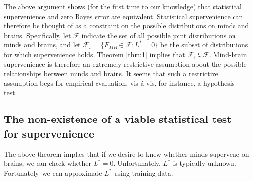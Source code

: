 \documentclass{article}
\providecommand{\mc}[1]{\mathcal{#1}}
\begin{document}

The above argument shows (for the first time to our knowledge) that statistical supervenience and zero Bayes error are equivalent. Statistical supervenience can therefore be thought of as a constraint on the possible distributions on minds and brains.  Specifically, let $\mc{F}$ indicate the set of all possible joint distributions on minds and brains, and let $\mc{F}_s = \{F_{MB} \in \mc{F}: L^*=0\}$ be the subset of distributions for which supervenience holds. Theorem \ref{thm:1} implies that $\mc{F}_s  \subsetneqq \mc{F}$.  Mind-brain supervenience is therefore an extremely restrictive assumption about the possible relationships between minds and brains.  It seems that such a restrictive assumption begs for empirical evaluation, vis-\'a-vis, for instance, a hypothesis test.


\subsection*{The non-existence of a viable statistical test for supervenience} %
\label{sub:subsection_name}


The above theorem implies that if we desire to know whether  minds supervene on brains, we can check whether $L^*=0$.  Unfortunately, $L^*$ is typically unknown.  Fortunately, we can approximate $L^*$ using training data.
\end{document}
